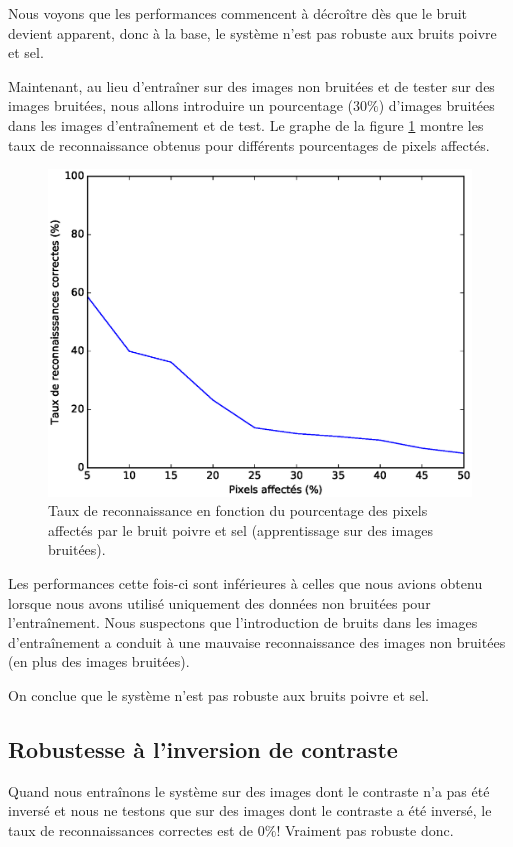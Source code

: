 Nous voyons que les performances commencent à décroître dès que le bruit
devient apparent, donc à la base, le système n'est pas robuste aux bruits
poivre et sel.

Maintenant, au lieu d'entraîner sur des images non bruitées et de tester sur des 
images bruitées, nous allons introduire un pourcentage ($30\%$) d'images bruitées
dans les images d'entraînement et de test. Le graphe de la figure \ref{fig:robustness:sp:tout} 
montre les taux de reconnaissance obtenus pour différents pourcentages de pixels affectés.
\begin{figure}[H]
    \centering
    \includegraphics[scale=0.5]{images/robustesse_sp_tout}
    \caption{Taux de reconnaissance en fonction du pourcentage des pixels affectés par le bruit
    poivre et sel (apprentissage sur des images bruitées).}
    \label{fig:robustness:sp:tout}
\end{figure}
Les performances cette fois-ci sont inférieures à celles que nous avions obtenu lorsque nous
avons utilisé uniquement des données non bruitées pour l'entraînement. Nous suspectons que 
l'introduction de bruits dans les images d'entraînement a conduit à une mauvaise reconnaissance
des images non bruitées (en plus des images bruitées).

On conclue que le système n'est pas robuste aux bruits poivre et sel.


\subsection{Robustesse à l'inversion de contraste}
Quand nous entraînons le système sur des images dont le contraste n'a pas été inversé et nous
ne testons que sur des images dont le contraste a été inversé, le taux de reconnaissances
correctes est de $0\%$! Vraiment pas robuste donc.

